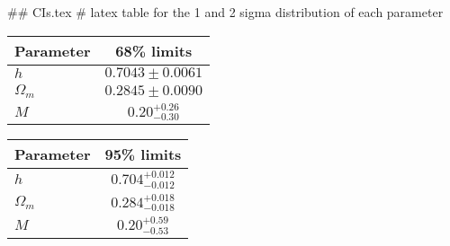 ## CIs.tex
# latex table for the 1 and 2 sigma distribution of each parameter

\begin{tabular} { l  c}
 Parameter &  68\% limits\\
\hline
{\boldmath$h              $} & $0.7043\pm 0.0061          $\\
{\boldmath$\Omega_m       $} & $0.2845\pm 0.0090          $\\
{\boldmath$M              $} & $0.20^{+0.26}_{-0.30}      $\\
\hline
\end{tabular}

\begin{tabular} { l  c}
 Parameter &  95\% limits\\
\hline
{\boldmath$h              $} & $0.704^{+0.012}_{-0.012}   $\\
{\boldmath$\Omega_m       $} & $0.284^{+0.018}_{-0.018}   $\\
{\boldmath$M              $} & $0.20^{+0.59}_{-0.53}      $\\
\hline
\end{tabular}
